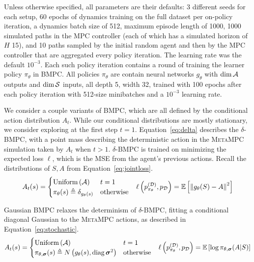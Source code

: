 \documentclass{article}
\begin{document}
Unless otherwise specified, all parameters are their defaults: 3 different seeds for each setup, 60 epochs of dynamics training on the full dataset per on-policy iteration, a dynamics batch size of 512, maximum episode length of 1000, 1000 simulated paths in the MPC controller (each of which has a simulated horizon of $H$ 15), and 10 paths sampled by the initial random agent and then by the MPC controller that are aggregated every policy iteration. The learning rate was the default $10^{-3}$. Each such policy iteration contains a round of training the learner policy $\pi_\theta$ in \textsc{BMPC}. All policies $\pi_\theta$ are contain neural networks $g_\theta$ with $\dim \mathcal{A}$ outputs and $\dim\mathcal{S}$ inputs, all depth 5, width 32, trained with 100 epochs after each policy iteration with 512-size minibatches and a $10^{-3}$ learning rate.

We consider a couple variants of \textsc{BMPC}, which are all defined by the conditional action distribution $A_t$. While our conditional distributions are mostly stationary, we consider exploring at the first step $t=1$. Equation~\ref{eq:delta} describes the $\delta$-\textsc{BMPC}, with a point mass describing the deterministic action in the \textsc{MetaMPC} simulation taken by $A_t$ when $t>1$. $\delta$-\textsc{BMPC} is trained on minimizing the expected loss $\ell$, which is the MSE from the agent's previous actions. Recall the distributions of $S,A$ from Equation~\ref{eq:jointloss}.
\begin{align} \label{eq:delta}
  A_t(s)=\begin{cases}
\operatorname{Uniform}\left({\mathcal{A}}\right)    & t=1 \\
\pi_\theta(s)\triangleq\delta_{g_\theta(s)} & \text{otherwise}
  \end{cases} && \ell\left({p_{\pi_\theta}^{(\mathcal{D})},p_{\mathcal{D}}}\right)=\operatorname{\mathbb{E}}\left[{\left\lVert g_\theta(S)-A \right\rVert^2}\right]
\end{align}

Gaussian \textsc{BMPC} relaxes the determinism of $\delta$-\textsc{BMPC}, fitting a conditional diagonal Gaussian to the \textsc{MetaMPC} actions, as described in Equation~\ref{eq:stochastic}.
\begin{align} \label{eq:stochastic}
  A_t(s)=\begin{cases}
\operatorname{Uniform}\left({\mathcal{A}}\right)    & t=1 \\
\pi_{\theta,{\boldsymbol\sigma}}(s) \triangleq N\left({g_\theta(s), \operatorname{diag}{\boldsymbol\sigma}^2}\right) & \text{otherwise}
  \end{cases} && \ell\left({p_{\pi_\theta}^{(\mathcal{D})},p_{\mathcal{D}}}\right)=\operatorname{\mathbb{E}}\left[{\log \pi_{\theta,{\boldsymbol\sigma}}(A|S)}\right]
\end{align}
\end{document}
